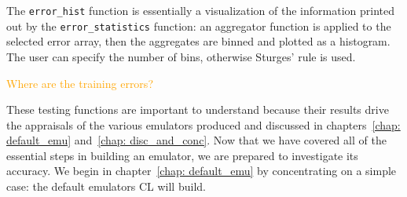 The \verb|error_hist| function is essentially a visualization of the 
information printed out by the \verb|error_statistics| function: an aggregator
function is applied to the selected error array, then the aggregates are 
binned and plotted as a histogram. The user can specify the number of bins,
otherwise Sturges' rule is used.

\textcolor{orange}{Where are the training errors?}

These testing functions are important to understand because their results
drive the appraisals of the various emulators produced and discussed in
chapters~\ref{chap: default_emu} and~\ref{chap: disc_and_conc}. Now that we
have covered all of the essential steps in building an emulator, we are
prepared to investigate its accuracy. We begin in
chapter~\ref{chap: default_emu} by concentrating on a simple case: the
default emulators CL will build.
